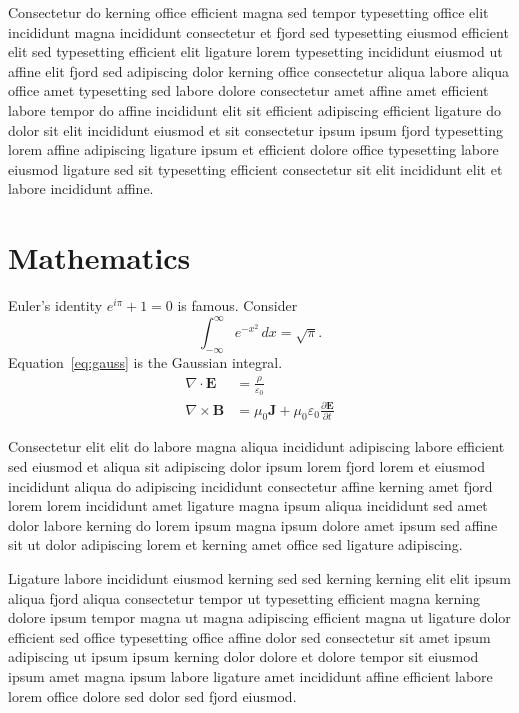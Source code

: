 \documentclass[11pt]{article}
\begin{document}
Consectetur do kerning office efficient magna sed tempor typesetting office elit incididunt magna incididunt consectetur et fjord sed typesetting eiusmod efficient elit sed typesetting efficient elit ligature lorem typesetting incididunt eiusmod ut affine elit fjord sed adipiscing dolor kerning office consectetur aliqua labore aliqua office amet typesetting sed labore dolore consectetur amet affine amet efficient labore tempor do affine incididunt elit sit efficient adipiscing efficient ligature do dolor sit elit incididunt eiusmod et sit consectetur ipsum ipsum fjord typesetting lorem affine adipiscing ligature ipsum et efficient dolore office typesetting labore eiusmod ligature sed sit typesetting efficient consectetur sit elit incididunt elit et labore incididunt affine.

\section{Mathematics}\label{sec:math}
Euler's identity $e^{i\pi}+1=0$ is famous. Consider
\begin{equation}\label{eq:gauss}
\int_{-\infty}^{\infty} e^{-x^2}\,dx = \sqrt{\pi}.
\end{equation}
Equation~\eqref{eq:gauss} is the Gaussian integral.
\begin{align}
  \nabla\cdot\mathbf{E} &= \frac{\rho}{\varepsilon_0} \\
  \nabla\times\mathbf{B} &= \mu_0\mathbf{J} + \mu_0\varepsilon_0\frac{\partial\mathbf{E}}{\partial t}
\end{align}

Consectetur elit elit do labore magna aliqua incididunt adipiscing labore efficient sed eiusmod et aliqua sit adipiscing dolor ipsum lorem fjord lorem et eiusmod incididunt aliqua do adipiscing incididunt consectetur affine kerning amet fjord lorem lorem incididunt amet ligature magna ipsum aliqua incididunt sed amet dolor labore kerning do lorem ipsum magna ipsum dolore amet ipsum sed affine sit ut dolor adipiscing lorem et kerning amet office sed ligature adipiscing.

Ligature labore incididunt eiusmod kerning sed sed kerning kerning elit elit ipsum aliqua fjord aliqua consectetur tempor ut typesetting efficient magna kerning dolore ipsum tempor magna ut magna adipiscing efficient magna ut ligature dolor efficient sed office typesetting office affine dolor sed consectetur sit amet ipsum adipiscing ut ipsum ipsum kerning dolor dolore et dolore tempor sit eiusmod ipsum amet magna ipsum labore ligature amet incididunt affine efficient labore lorem office dolore sed dolor sed fjord eiusmod.
\end{document}
